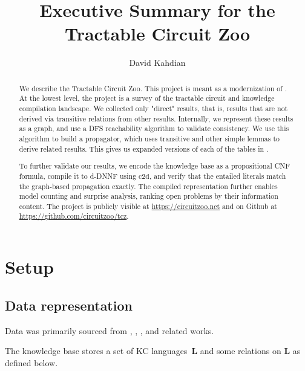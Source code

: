 \documentclass[10pt]{article}
\title{Executive Summary for the Tractable Circuit Zoo}
\author{David Kahdian}
\theoremstyle{plain}
\theoremstyle{definition}
\theoremstyle{remark}
\begin{document}
\maketitle

\begin{abstract}
We describe the Tractable Circuit Zoo. This project is meant as a modernization of \citet{Darwiche_2002}. At the lowest level, the project is a survey of the tractable circuit and knowledge compilation landscape. We collected only "direct" results, that is, results that are not derived via transitive relations from other results. Internally, we represent these results as a graph, and use a DFS reachability algorithm to validate consistency. We use this algorithm to build a propagator, which uses transitive and other simple lemmas to derive related results. This gives us expanded versions of each of the tables in \citet{Darwiche_2002}.

To further validate our results, we encode the knowledge base as a propositional CNF formula, compile it to d-DNNF using $\text{c2d}$, and verify that the entailed literals match the graph-based propagation exactly. The compiled representation further enables model counting and surprise analysis, ranking open problems by their information content. The project is publicly visible at \url{https://circuitzoo.net} and on Github at \url{https://github.com/circuitzoo/tcz}.
\end{abstract}

\section{Setup}

\subsection{Data representation}
Data was primarily sourced from \citep{Darwiche_2002}, \citep{Amarilli_2020}, \citep{Bova_2016}, and related works.

The knowledge base stores a set of KC languages~$\textbf{L}$ and some relations on $\textbf{L}$ as defined below.
\end{document}
